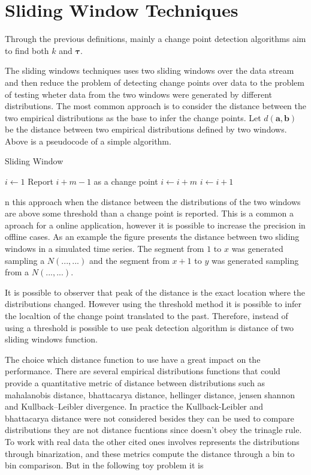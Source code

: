 \section{Sliding Window Techniques}

Through the previous definitions, mainly a change point detection algorithms aim to find both $k$ and $\boldsymbol \tau$.

The sliding windows techniques uses two sliding windows over the data stream and then reduce the problem of detecting change points over data to the problem of testing wheter data from the two windows were generated by different distributions. The most common approach is to consider the distance between the two empirical distributions as the base to infer the change points. Let $d(\mathbf{a}, \mathbf{b})$ be the distance between two empirical distributions defined by two windows. Above is a pseudocode of a simple algorithm.

\begin{algorithm}[H]
\caption{Sliding Window}
	\begin{algorithmic}[1]
		\State $i \gets 1$
                \State Report $i + m - 1$ as a change point
		        \State $i \gets i + m$
             \Else
		        \State $i \gets i + 1$
             \EndIf
        \EndWhile
	\end{algorithmic}
\end{algorithm}

n this approach when the distance between the distributions of the two windows are above some threshold than a change point is reported. This is a common a aproach for a online application, however it is possible to increase the precision in offline cases. As an example the figure presents the distance between two sliding windows in a simulated time series. The segment from $1$ to $x$ was generated sampling a $N(..., ...)$ and the segment from $x+1$ to $y$ was generated sampling from a $N(..., ...)$.

It is possible to observer that peak of the distance is the exact location where the distributions changed. However using the threshold method it is possible to infer the localtion of the change point translated to the past. Therefore, instead of using a threshold is possible to use peak detection algorithm is distance of two sliding windows function.

The choice which distance function to use have a great impact on the performance. There are several empirical distributions functions that could provide a quantitative metric of distance between distributions such as mahalanobis distance, bhattacarya distance, hellinger distance, jensen shannon and Kullback–Leibler divergence. In practice the Kullback-Leibler and bhattacarya distance were not considered besides they can be used to compare distributions they are not distance fucntions since doesn't obey the trinagle rule. To work with real data the other cited ones involves represents the distributions through binarization, and these metrics compute the distance through a bin to bin comparison. But in the following toy problem it is  

